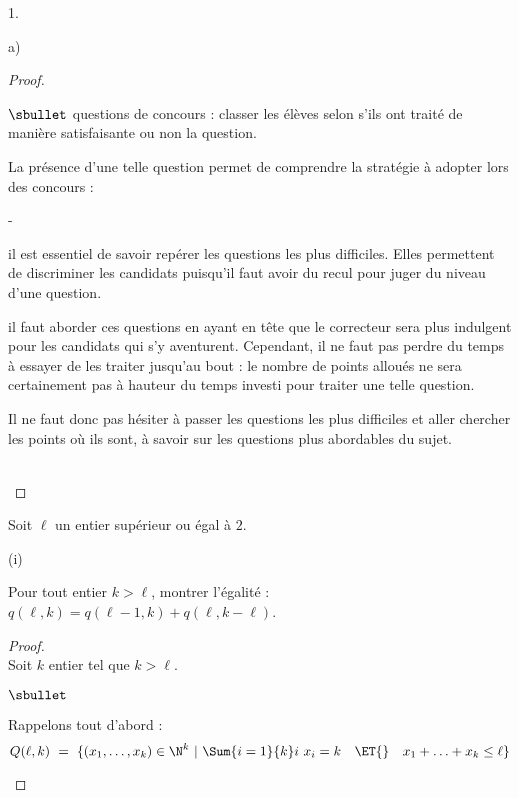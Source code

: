 \documentclass[11pt]{article}%
\begin{document}
\begin{noliste}{1.}
\begin{noliste}{a)}
\begin{proof}
\begin{remarkL}{.98}
\begin{noliste}{$\sbullet$}
          questions de concours : classer les élèves selon
          s'ils ont traité de manière satisfaisante ou non la question.
        \end{noliste}
        La présence d'une telle question permet de comprendre la
        stratégie à adopter lors des concours :
        \begin{noliste}{-}
        \item il est essentiel de savoir repérer les questions les
          plus difficiles. Elles permettent de discriminer les candidats
          puisqu'il faut avoir du recul pour juger du niveau d'une
          question.
        \item il faut aborder ces questions en
          ayant en tête que le correcteur sera plus indulgent pour les
          candidats qui s'y aventurent. Cependant, il ne faut pas
          perdre du temps à essayer de les traiter jusqu'au bout : le
          nombre de points alloués ne sera certainement pas à hauteur
          du temps investi pour traiter une telle question. 
        \end{noliste}
        Il ne faut donc pas hésiter à passer les questions les plus
        difficiles et aller chercher les points où ils sont, à savoir
        sur les questions plus abordables du sujet.
      \end{remarkL}~\\[-1.4cm]
    \end{proof}


    \newpage
    
    
  \item Soit $\ell$ un entier supérieur ou égal à $2$.
    \begin{nonoliste}{(i)}
    \item Pour tout entier $k > \ell$, montrer l'égalité : \
      $q(\ell,k) = q(\ell-1,k) + q(\ell, k-\ell)$.
      
      \begin{proof}~\\%
        Soit $k$ entier tel que $k > \ell$.
        \begin{noliste}{$\sbullet$}
        \item Rappelons tout d'abord :
          \[
          Q(\ell, k) \ = \ \{ (x_1, \ldots, x_{k}) \in \N^{k} \ | \
          \Sum{i=1}{k} i \ x_i = k \quad \ET{} \quad x_1 + \ldots + x_{k} \leq
          \ell \}
          \]


\end{noliste}
\end{proof}
\end{nonoliste}
\end{noliste}
\end{noliste}
\end{document}
